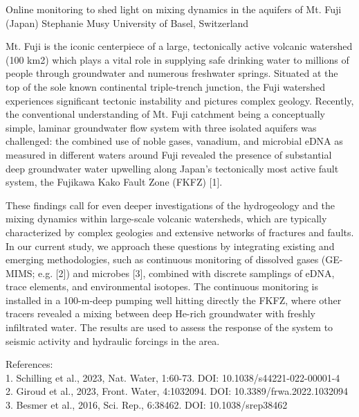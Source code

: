 \begin{conf-abstract}
{Online monitoring to shed light on mixing dynamics in the aquifers of Mt. Fuji (Japan)}
{Stephanie	Musy}
{University of Basel, Switzerland}
{
Mt. Fuji is the iconic centerpiece of a large, tectonically active volcanic watershed (100 km2) which plays a vital role in supplying safe drinking water to millions of people through groundwater and numerous freshwater springs. Situated at the top of the sole known continental triple-trench junction, the Fuji watershed experiences significant tectonic instability and pictures complex geology. Recently, the conventional understanding of Mt. Fuji catchment being a conceptually simple, laminar groundwater flow system with three isolated aquifers was challenged: the combined use of noble gases, vanadium, and microbial eDNA as measured in different waters around Fuji revealed the presence of substantial deep groundwater water upwelling along Japan’s tectonically most active fault system, the Fujikawa Kako Fault Zone (FKFZ) [1].

These findings call for even deeper investigations of the hydrogeology and the mixing dynamics within large-scale volcanic watersheds, which are typically characterized by complex geologies and extensive networks of fractures and faults. In our current study, we approach these questions by integrating existing and emerging methodologies, such as continuous monitoring of dissolved gases (GE-MIMS; e.g. [2]) and microbes [3], combined with discrete samplings of eDNA, trace elements, and environmental isotopes. The continuous monitoring is installed in a 100-m-deep pumping well hitting directly the FKFZ, where other tracers revealed a mixing between deep He-rich groundwater with freshly infiltrated water. The results are used to assess the response of the system to seismic activity and hydraulic forcings in the area. 

References:\\
1. Schilling et al., 2023, Nat. Water, 1:60-73. DOI: 10.1038/s44221-022-00001-4\\
2. Giroud et al., 2023, Front. Water, 4:1032094. DOI: 10.3389/frwa.2022.1032094\\
3. Besmer et al., 2016, Sci. Rep., 6:38462. DOI: 10.1038/srep38462
}
\end{conf-abstract}
